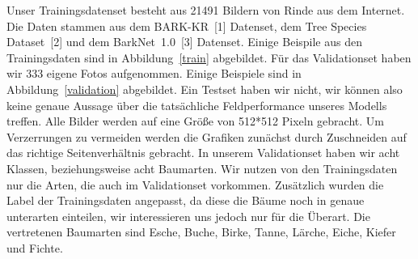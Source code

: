 \documentclass{article}
\begin{document}
Unser Trainingsdatenset besteht aus 21491 Bildern von Rinde aus dem Internet. Die Daten stammen aus dem BARK-KR~[1] Datenset, dem Tree Species Dataset~[2] und dem BarkNet~1.0~[3] Datenset. Einige Beispile aus den Trainingsdaten sind in Abbildung~\ref{train} abgebildet. Für das Validationset haben wir 333 eigene Fotos aufgenommen. Einige Beispiele sind in Abbildung~\ref{validation} abgebildet. Ein Testset haben wir nicht, wir können also keine genaue Aussage über die tatsächliche Feldperformance unseres Modells treffen. Alle Bilder werden auf eine Grö\ss e von 512*512 Pixeln gebracht. Um Verzerrungen zu vermeiden werden die Grafiken zunächst durch Zuschneiden auf das richtige Seitenverhältnis gebracht. In unserem Validationset haben wir acht Klassen, beziehungsweise acht Baumarten. Wir nutzen von den Trainingsdaten nur die Arten, die auch im Validationset vorkommen. Zusätzlich wurden die Label der Trainingsdaten angepasst, da diese die Bäume noch in genaue unterarten einteilen, wir interessieren uns jedoch nur für die Überart. Die vertretenen Baumarten sind Esche, Buche, Birke, Tanne, Lärche, Eiche, Kiefer und Fichte.
\end{document}
